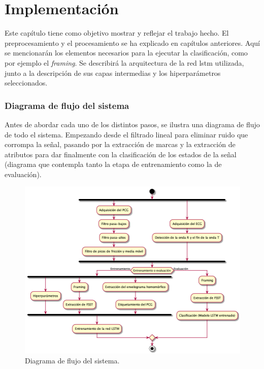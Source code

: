 \chapter{Implementación} \label{cha:results}

\indent Este capítulo tiene como objetivo mostrar y reflejar el trabajo hecho. El preprocesamiento y el procesamiento se ha explicado en capítulos anteriores. Aquí se mencionarán los elementos necesarios para la ejecutar la clasificación, como por ejemplo el \textit{framing}. Se describirá la arquitectura de la red \acrshort{lstm} utilizada, junto a la descripción de sus capas intermedias y los hiperparámetros seleccionados. \bigskip

\subsection*{Diagrama de flujo del sistema}

\indent Antes de abordar cada uno de los distintos pasos, se ilustra una diagrama de flujo de todo el sistema. Empezando desde el filtrado lineal para eliminar ruido que corrompa la señal, pasando por la extracción de marcas y la extracción de atributos para dar finalmente con la clasificación de los estados de la señal (diagrama que contempla tanto la etapa de entrenamiento como la de evaluación).


\begin{figure}[H]
    \centering
    \includegraphics[scale=0.7]{sections/chapter-07/images/flow-diagram.png}
    \caption[Diagrama de flujo del sistema]{Diagrama de flujo del sistema.}
    \label{fig:flow-diagram}  
\end{figure}

